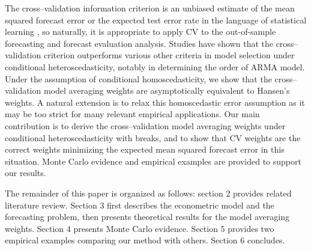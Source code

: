 The cross--validation information criterion is an unbiased estimate of the mean squared forecast error or the expected test error rate in the language of statistical learning \cite{elements_statistical_learning}, so naturally, it is appropriate to apply CV to the out-of-sample forecasting and forecast evaluation analysis. Studies have shown that the cross--validation criterion outperforms various other criteria in model selection under conditional heteroscedasticity, notably in determining the order of ARMA model. Under the assumption of conditional homoscedasticity, we show that the cross--validation model averaging weights are asymptotically equivalent to Hansen's weights. A natural extension is to relax this homoscedastic error assumption as it may be too strict for many relevant empirical applications. Our main contribution is to derive the cross--validation model averaging weights under conditional heteroscedasticity with breaks, and to show that CV weights are the correct weights minimizing the expected mean squared forecast error in this situation. Monte Carlo evidence and empirical examples are provided to support our results.

The remainder of this paper is organized as follows: section 2 provides related literature review. Section 3 first describes the econometric model and the forecasting problem, then presents theoretical results for the model averaging weights. Section 4 presents Monte Carlo evidence. Section 5 provides two empirical examples comparing our method with others. Section 6 concludes. 